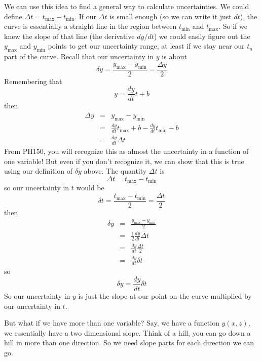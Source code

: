 We can use this idea to find a general way to calculate uncertainties. We
could define $\Delta t=t_{\max }-t_{\min }$. If our $\Delta t$ is small
enough (so we can write it just $dt$), the curve is essentially a straight
line in the region between $t_{\min }$ and $t_{\max }.$ So if we knew the
slope of that line (the derivative $dy/dt$) we could easily figure out the $%
y_{\max }$ and $y_{\min }$ points to get our uncertainty range, at least if
we stay near our $t_{n}$ part of the curve. Recall that our uncertainty in $%
y $ is about%
\begin{equation*}
\delta y=\frac{y_{\max }-y_{\min }}{2}=\frac{\Delta y}{2}
\end{equation*}%
Remembering that 
\begin{equation*}
y=\frac{dy}{dt}t+b
\end{equation*}%
then 
\begin{eqnarray*}
\Delta y &=&y_{\max }-y_{\min } \\
&=&\frac{dy}{dt}t_{\max }+b-\frac{dy}{dt}t_{\min }-b \\
&=&\frac{dy}{dt}\Delta t
\end{eqnarray*}%
From PH150, you will recognize this as almost the uncertainty in a function
of one variable! But even if you don't recognize it, we can show that this
is true using our definition of $\delta y$ above. The quantity $\Delta t$ is 
\begin{equation*}
\Delta t=t_{\max }-t_{\min }
\end{equation*}%
so our uncertainty in $t$ would be 
\begin{equation*}
\delta t=\frac{t_{\max }-t_{\min }}{2}=\frac{\Delta t}{2}
\end{equation*}%
then 
\begin{eqnarray*}
\delta y &=&\frac{y_{\max }-y_{\min }}{2} \\
&=&\frac{1}{2}\frac{dy}{dt}\Delta t \\
&=&\frac{dy}{dt}\frac{\Delta t}{2} \\
&=&\frac{dy}{dt}\delta t
\end{eqnarray*}%
so%
\begin{equation*}
\delta y=\frac{dy}{dt}\delta t
\end{equation*}%
So our uncertainty in $y$ is just the slope at our point on the curve
multiplied by our uncertainty in $t.$

But what if we have more than one variable? Say, we have a function $y(x,z),$
we essentially have a two dimensional slope. Think of a hill, you can go
down a hill in more than one direction. So we need slope parts for each
direction we can go.

